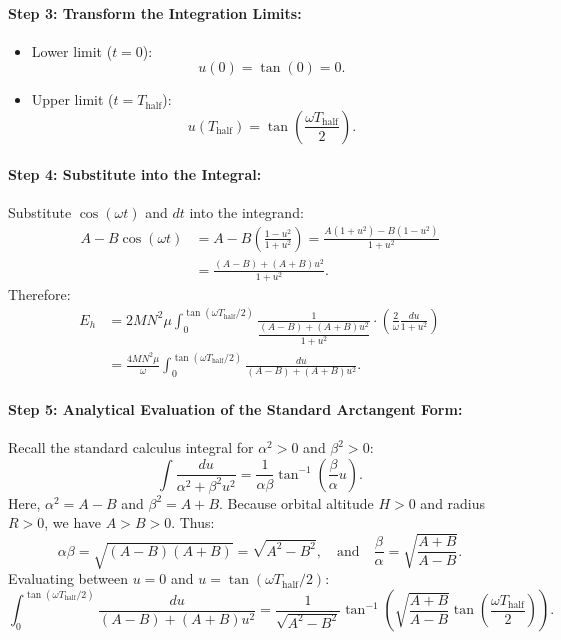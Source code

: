 \documentclass[11pt,a4paper]{article}
\begin{document}
\paragraph{Step 3: Transform the Integration Limits:}
\begin{itemize}
    \item Lower limit ($t = 0$):
    \begin{equation*}
        u(0) = \tan(0) = 0.
    \end{equation*}
    \item Upper limit ($t = T_{\text{half}}$):
    \begin{equation*}
        u(T_{\text{half}}) = \tan\left( \frac{\omega T_{\text{half}}}{2} \right).
    \end{equation*}
\end{itemize}

\paragraph{Step 4: Substitute into the Integral:}
Substitute $\cos(\omega t)$ and $dt$ into the integrand:
\begin{align*}
    A - B\cos(\omega t) &= A - B\left( \frac{1 - u^2}{1 + u^2} \right) = \frac{A(1 + u^2) - B(1 - u^2)}{1 + u^2} \\
    &= \frac{(A - B) + (A + B)u^2}{1 + u^2}.
\end{align*}
Therefore:
\begin{align}
    E_h &= 2 M N^2 \mu \int_0^{\tan(\omega T_{\text{half}} / 2)} \frac{1}{\dfrac{(A - B) + (A + B)u^2}{1 + u^2}} \cdot \left( \frac{2}{\omega} \frac{du}{1 + u^2} \right) \nonumber \\
        &= \frac{4 M N^2 \mu}{\omega} \int_0^{\tan(\omega T_{\text{half}} / 2)} \frac{du}{(A - B) + (A + B)u^2}.
\end{align}

\paragraph{Step 5: Analytical Evaluation of the Standard Arctangent Form:}
Recall the standard calculus integral for $\alpha^2 > 0$ and $\beta^2 > 0$:
\begin{equation}
    \int \frac{du}{\alpha^2 + \beta^2 u^2} = \frac{1}{\alpha \beta} \tan^{-1}\left( \frac{\beta}{\alpha} u \right).
\end{equation}
Here, $\alpha^2 = A - B$ and $\beta^2 = A + B$. Because orbital altitude $H > 0$ and radius $R > 0$, we have $A > B > 0$. Thus:
\begin{equation}
    \alpha \beta = \sqrt{(A - B)(A + B)} = \sqrt{A^2 - B^2}, \quad \text{and} \quad \frac{\beta}{\alpha} = \sqrt{\frac{A + B}{A - B}}.
\end{equation}
Evaluating between $u = 0$ and $u = \tan(\omega T_{\text{half}} / 2)$:
\begin{equation}
    \int_0^{\tan(\omega T_{\text{half}} / 2)} \frac{du}{(A - B) + (A + B)u^2} = \frac{1}{\sqrt{A^2 - B^2}} \tan^{-1}\left( \sqrt{\frac{A + B}{A - B}} \tan\left(\frac{\omega T_{\text{half}}}{2}\right) \right).
\end{equation}
\end{document}
